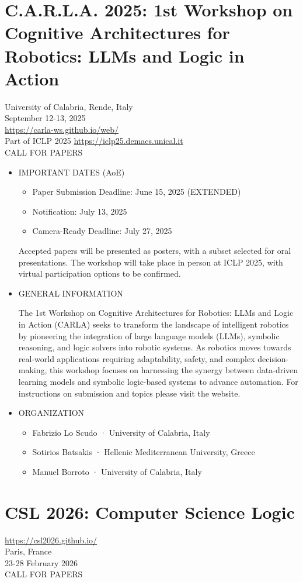 \documentclass[prodmode,acmtecs]{acmsmall} %
\begin{document}
\section{C.A.R.L.A. 2025: 1st Workshop on Cognitive Architectures for Robotics: LLMs and Logic in Action}\label{CARLA2025}  University of Calabria, Rende, Italy\\ 
  September 12-13, 2025\\ 
  \href{https://carla-ws.github.io/web/}{https://carla-ws.github.io/web/}\\ 
  Part of ICLP 2025 \href{https://iclp25.demacs.unical.it}{https://iclp25.demacs.unical.it}\\ 
CALL FOR PAPERS  

\begin{itemize}\item  IMPORTANT DATES (AoE) 
 
\begin{itemize}\item  Paper Submission Deadline: June 15, 2025 (EXTENDED)
\item  Notification: July 13, 2025
\item  Camera-Ready Deadline: July 27, 2025
\end{itemize} 
  Accepted papers will be presented as posters, with a subset selected for oral presentations. The workshop will take place in person at ICLP 2025, with virtual participation options to be confirmed. 
 
\item  GENERAL INFORMATION 
 
  The 1st Workshop on Cognitive Architectures for Robotics: LLMs and Logic in Action (CARLA) seeks to transform the landscape of intelligent robotics by pioneering the integration of large language models (LLMs), symbolic reasoning, and logic solvers into robotic systems. As robotics moves towards real-world applications requiring adaptability, safety, and complex decision-making, this workshop focuses on harnessing the synergy between data-driven learning models and symbolic logic-based systems to advance automation. For instructions on submission and topics please visit the website.  
 
\item  ORGANIZATION 
 
\begin{itemize}\item  Fabrizio Lo Scudo · University of Calabria, Italy
\item  Sotirios Batsakis · Hellenic Mediterranean University, Greece
\item  Manuel Borroto · University of Calabria, Italy
\end{itemize} 
\end{itemize}\section{CSL 2026: Computer Science Logic}\label{CSL2026}  \href{https://csl2026.github.io/}{https://csl2026.github.io/}\\ 
  Paris, France\\ 
  23-28 February 2026\\ 
CALL FOR PAPERS 
\end{document}
